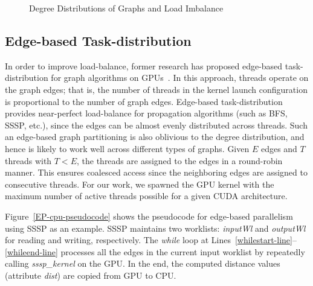 \begin {figure}
\centering
{}
\caption{Degree Distributions of Graphs and Load Imbalance}
\label{fig:dd}
\end{figure}

\subsection{Edge-based Task-distribution}
In order to improve load-balance, former research has proposed edge-based task-distribution for graph algorithms on GPUs~\cite{sariyuce-bc-gpgpu2013}.
In this approach, threads operate on the graph edges;
that is, the number of threads in the kernel launch configuration is proportional to the number of graph edges.
Edge-based task-distribution provides near-perfect load-balance for propagation algorithms (such as BFS, SSSP, etc.),
since the edges can be almost evenly distributed across threads.
Such an edge-based graph partitioning is also oblivious to the degree distribution, and hence is likely to work well across different types of graphs.
Given $E$ edges and $T$ threads with $T < E$, the threads are assigned to the edges in a round-robin manner. This ensures coalesced access since the neighboring edges are assigned to consecutive threads. For our work, we spawned the GPU kernel with the maximum number of active threads possible for a given CUDA architecture.

Figure~\ref{EP-cpu-pseudocode} shows the pseudocode for edge-based parallelism using SSSP as an example.  SSSP maintains two worklists: \textit{inputWl} and \textit{outputWl} for reading and writing, respectively.  The \textit{while} loop at Lines~\ref{whilestart-line}--\ref{whileend-line} processes all the edges in the current input worklist by repeatedly calling \textit{sssp\_kernel} on the GPU. In the end, the computed distance values (attribute \textit{dist}) are copied from GPU to CPU.

